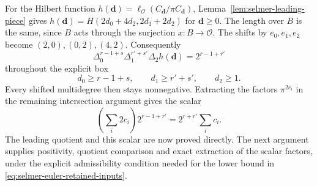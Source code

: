 For the Hilbert function
$h(\boldsymbol d)=\ell_{\mathcal O}(C_{\boldsymbol d}/\pi C_{\boldsymbol d})$,
Lemma~\ref{lem:selmer-leading-piece} gives
$h(\boldsymbol d)=H(2d_0+4d_2,2d_1+2d_2)$ for $\boldsymbol d\ge0$.
The length over $B$ is the same, since $B$ acts through the surjection
$x:B\to\mathcal O$.
The shifts by $e_0,e_1,e_2$ become $(2,0),(0,2),(4,2)$. Consequently
\[
 \Delta_0^{r-1+s}\Delta_1^{r'+s'}\Delta_2h(\boldsymbol d)
 =2^{r-1+r'}
\]
throughout the explicit box
\[
 d_0\ge r-1+s,\qquad d_1\ge r'+s',\qquad d_2\ge1.
\]
Every shifted multidegree then stays nonnegative. Extracting the factors
$\pi^{2c_i}$ in the remaining intersection argument gives the scalar
\[
 \left(\sum_i2c_i\right)2^{r-1+r'}=2^{r+r'}\sum_i c_i.
\]
The leading quotient and this scalar are now proved directly. The next
argument supplies positivity, quotient comparison and exact extraction
of the scalar factors, under the explicit admissibility condition
needed for the lower bound in \eqref{eq:selmer-euler-retained-inputs}.
